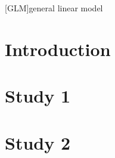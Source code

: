 \documentclass[english,12pt]{report}
\begin{document}
\begin{spacing}{1.5}
\renewcommand{\baselinestretch}{0.75}\normalsize

\begin{acronym}[longest]
    [GLM]{general linear model}
\end{acronym}

\renewcommand{\baselinestretch}{1}\normalsize




\tableofcontents












\chapter{Introduction}
\setcounter{page}{1}






\chapter{Study 1}






\chapter{Study 2}







\end{spacing}
\end{document}

